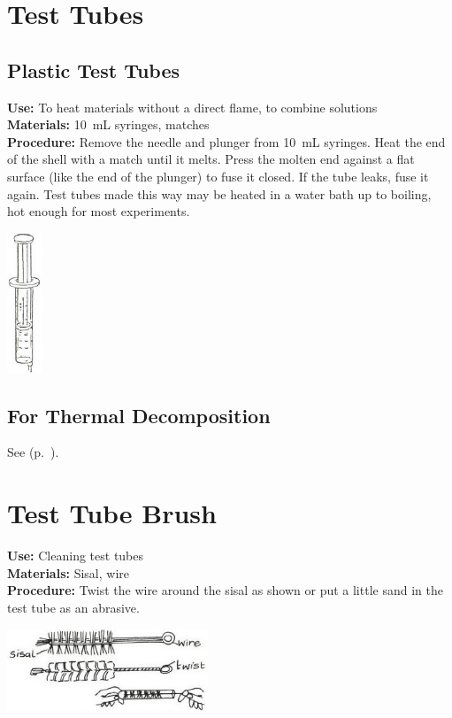 \begin{multicols}{2}
\columnbreak

\section{Test Tubes} 
\label{sec:testtubes}

\subsection{Plastic Test Tubes}
\vspace{-6pt}
\textbf{Use:} To heat materials without a direct flame, to combine solutions\\
\textbf{Materials:} 10~mL syringes, matches\\
\textbf{Procedure:} Remove the needle and plunger from 10~mL syringes. Heat the end of the shell with a match until it melts. Press the molten end against a flat surface (like the end of the plunger) to fuse it closed. If the tube leaks, fuse it again. Test tubes made this way may be heated in a water bath up to boiling, hot enough for most experiments.
\begin{center}
\includegraphics[width=0.08\textwidth]{./img/source/syringe.jpg}
\end{center}

\subsection{For Thermal Decomposition} 
See  (p.~\pageref{sec:deflagratingspoon}).

\section{Test Tube Brush} 
\label{sec:test-tube-brush}
\vspace{-10pt}
\textbf{Use:} Cleaning test tubes\\
\textbf{Materials:} Sisal, wire\\
\textbf{Procedure:} Twist the wire around the sisal as shown or put a little sand in the test tube as an abrasive.
\begin{center}
\includegraphics[width=0.45\textwidth]{./img/vso/test-tube-brush.jpg}
\end{center}


\end{multicols}
